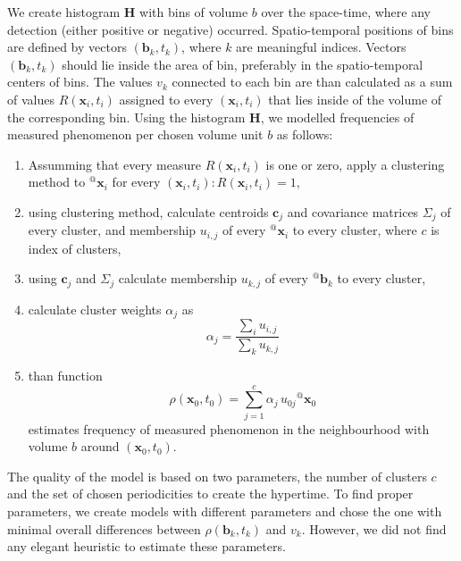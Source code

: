 We create histogram $\mathbf{H}$ with bins of volume $b$ over the space-time, where any detection (either positive or negative) occurred.
Spatio-temporal positions of bins are defined by vectors $\left(\mathbf{b}_{k}, t_{k}\right)$, where $k$ are meaningful indices.
Vectors $\left(\mathbf{b}_{k}, t_{k}\right)$ should lie inside the area of bin, preferably in the spatio-temporal centers of bins.
The values $v_{k}$ connected to each bin are than calculated as a sum of values $R\left(\mathbf{x}_i, t_i\right)$ assigned to every $\left(\mathbf{x}_i, t_i\right)$ that lies inside of the volume of the corresponding bin.
Using the histogram $\mathbf{H}$, we modelled frequencies of measured phenomenon per chosen volume unit $b$ as follows:
\begin{enumerate}
    \item Assumming that every measure $R\left(\mathbf{x}_i, t_i\right)$ is one or zero,  apply a clustering method to ${}^{@}\mathbf{x}_{i}$ for every $\left(\mathbf{x}_i, t_i\right) : R\left(\mathbf{x}_i, t_i\right) = 1 $,
    \item using clustering method, calculate centroids $\mathbf{c}_j$ and covariance matrices $\Sigma_{j}$ of every cluster, and membership $u_{i, j}$ of every ${}^{@}\mathbf{x}_{i}$ to every cluster, where $c$ is index of clusters,
    \item using $\mathbf{c}_j$ and $\Sigma_{j}$ calculate membership $u_{k, j}$ of every ${}^{@}\mathbf{b}_{k}$ to every cluster,
    \item calculate cluster weights $\alpha_{j}$ as
\begin{equation}\label{eqn:clusterWeights}
    \alpha_{j} = \frac{\sum_{i}u_{i, j}}{\sum_{k}u_{k, j}}
\end{equation}
    \item than function
\begin{equation}\label{eqn:distribution}
    \rho\left(\mathbf{x}_{0},t_{0}\right) = \sum_{j=1}^{c}{\alpha_j\,u_{0j}{}^{@}\mathbf{x}_{0}}
\end{equation}
estimates frequency of measured phenomenon in the neighbourhood with volume $b$ around $\left(\mathbf{x}_0, t_0\right)$.
\end{enumerate}
%


The quality of the model is based on two parameters, the number of clusters $c$ and the set of chosen periodicities to create the hypertime.
To find proper parameters, we create models with different parameters and chose the one with minimal overall differences between $\rho\left(\mathbf{b}_{k},t_{k}\right)$ and $v_{k}$.
However, we did not find any elegant heuristic to estimate these parameters.


